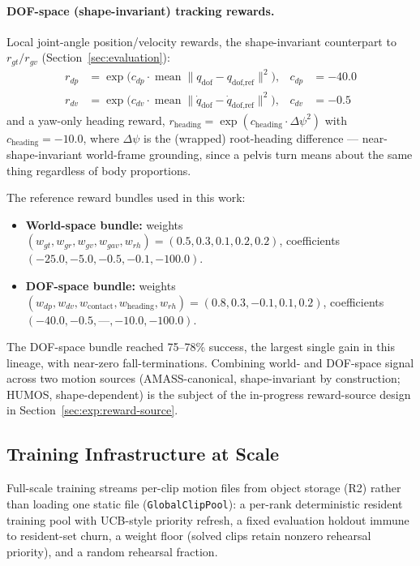 \paragraph{DOF-space (shape-invariant) tracking rewards.} Local joint-angle position/velocity
rewards, the shape-invariant counterpart to $r_{gt}/r_{gv}$ (Section~\ref{sec:evaluation}):
\begin{align}
  r_{dp} &= \exp\!\big(c_{dp} \cdot \operatorname{mean}\|q_{\text{dof}} - q_{\text{dof,ref}}\|^2\big), & c_{dp} &= -40.0 \\
  r_{dv} &= \exp\!\big(c_{dv} \cdot \operatorname{mean}\|\dot{q}_{\text{dof}} - \dot{q}_{\text{dof,ref}}\|^2\big), & c_{dv} &= -0.5
\end{align}
and a yaw-only heading reward, $r_{\text{heading}} = \exp(c_{\text{heading}} \cdot
\Delta\psi^2)$ with $c_{\text{heading}} = -10.0$, where $\Delta\psi$ is the (wrapped) root-heading
difference — near-shape-invariant world-frame grounding, since a pelvis turn means about the same
thing regardless of body proportions.

The reference reward bundles used in this work:
\begin{itemize}
  \item \textbf{World-space bundle:} weights $(w_{gt}, w_{gr}, w_{gv}, w_{gav}, w_{rh}) = (0.5,
  0.3, 0.1, 0.2, 0.2)$, coefficients $(-25.0, -5.0, -0.5, -0.1, -100.0)$.
  \item \textbf{DOF-space bundle:} weights $(w_{dp}, w_{dv}, w_{\text{contact}},
  w_{\text{heading}}, w_{rh}) = (0.8, 0.3, -0.1, 0.1, 0.2)$, coefficients $(-40.0, -0.5,
  \text{---}, -10.0, -100.0)$.
\end{itemize}
The DOF-space bundle reached 75--78\% success, the largest single gain in this lineage, with
near-zero fall-terminations. Combining world- and DOF-space signal across two motion sources
(AMASS-canonical, shape-invariant by construction; HUMOS, shape-dependent) is the subject of the
in-progress reward-source design in Section~\ref{sec:exp:reward-source}.

\subsection{Training Infrastructure at Scale}
\label{sec:method:infra}

Full-scale training streams per-clip motion files from object storage (R2) rather than loading one
static file (\texttt{GlobalClipPool}): a per-rank deterministic resident training pool with
UCB-style priority refresh, a fixed evaluation holdout immune to resident-set churn, a weight floor
(solved clips retain nonzero rehearsal priority), and a random rehearsal fraction.

